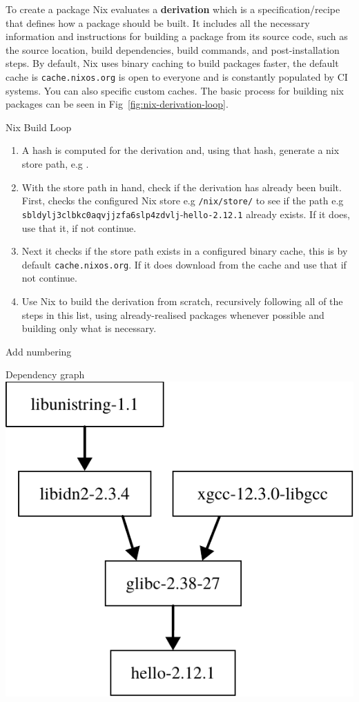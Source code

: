 To create a package Nix evaluates a \textbf{derivation} which is a specification/recipe that defines how a package should be built. It includes all the necessary information and instructions for building a package from its source code, such as the source location, build dependencies, build commands, and post-installation steps. By default, Nix uses binary caching to build packages faster, the default cache is \texttt{cache.nixos.org} is open to everyone and is constantly populated by CI systems. You can also specific custom caches. The basic process for building nix packages can be seen in Fig~\ref{fig:nix-derivation-loop}.

\begin{figureBox}[label = {fig:nix-derivation-loop}]{Nix Build Loop}
  \begin{enumerate}
    \item A hash is computed for the derivation and, using that hash, generate a nix store path, e.g .
    \item  With the store path in hand, check if the derivation has already been built. First, checks the configured Nix store e.g {\color{Purple}\texttt{/nix/store/}} to see if the path e.g {\color{RoyalBlue}\texttt{sbldylj3clbkc0aqvjjzfa6slp4zdvlj}}-{\color{Orange}\texttt{hello-2.12.1}} already exists. If it does, use that it, if not continue.
    \item Next it checks if the store path exists in a configured binary cache, this is by default \texttt{cache.nixos.org}. If it does download from the cache and use that if not continue.
    \item Use Nix to build the derivation from scratch, recursively following all of the steps in this list, using already-realised packages whenever possible and building only what is necessary.
  \end{enumerate}
\end{figureBox}

\todo Add numbering



\begin{figureBox}{Dependency graph}
  \includegraphics[width=0.5\linewidth]{./background/figures/nix/hello-pkg.pdf}
\end{figureBox}

